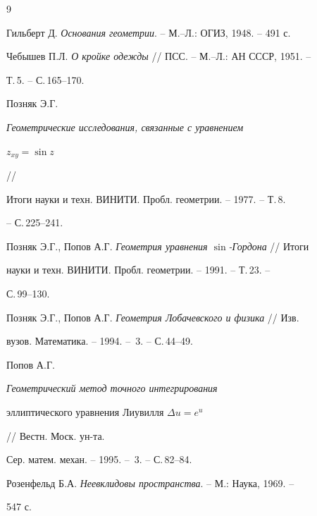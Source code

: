 \begin{thebibliography}{9} 


 




Гильберт Д. {\em Основания геометрии}. -- М.--Л.: ОГИЗ, 1948. -- 491 с. 




Чебышев П.Л. {\em О кройке одежды} // ПСС. -- М.--Л.: АН СССР, 1951. -- 


Т.\,5. -- С.\,165--170. 




Позняк Э.Г. {\em Геометрические исследования, связанные с уравнением 


$z_{x{}y}=\sin{}z$} // 


Итоги науки и техн. ВИНИТИ. Пробл. геометрии. -- 1977. -- Т.\,8. 


-- С.\,225--241. 




Позняк Э.Г., Попов А.Г. {\em Геометрия уравнения $\sin$-Гордона} // Итоги 


науки и техн. ВИНИТИ. Пробл. геометрии. -- 1991. -- Т.\,23. -- 


С.\,99--130. 




Позняк Э.Г., Попов А.Г. {\em Геометрия Лобачевского и физика} // Изв. 


вузов. Математика. -- 1994. -- \No\,3. -- С.\,44--49. 




Попов А.Г. {\em Геометрический метод точного интегрирования 


эллиптического уравнения Лиувилля $\Delta{}u=e^u$} // Вестн. Моск. ун-та. 


Сер. матем. механ. -- 1995. -- \No\,3. -- С.\,82--84. 




Розенфельд Б.А. {\em Неевклидовы пространства}. -- М.: Наука, 1969. -- 


547 с. 


 


\end{thebibliography} 


 


\vskip 0.5cm 


 






 


\label{end} 


 


